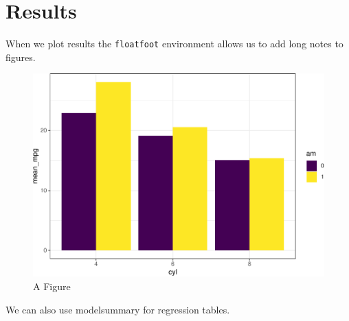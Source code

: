 \documentclass[
  11pt,
a4paper
]{article}
\begin{document}
\FloatBarrier

\hypertarget{results}{%
\section{Results}\label{results}}

When we plot results the \texttt{floatfoot} environment allows us to add long notes to figures.



\begin{figure}
\includegraphics{figures/figure-1} \caption[A Figure]{A Figure}\label{fig:figure}
 \end{figure}

We can also use modelsummary for regression tables.
\end{document}
